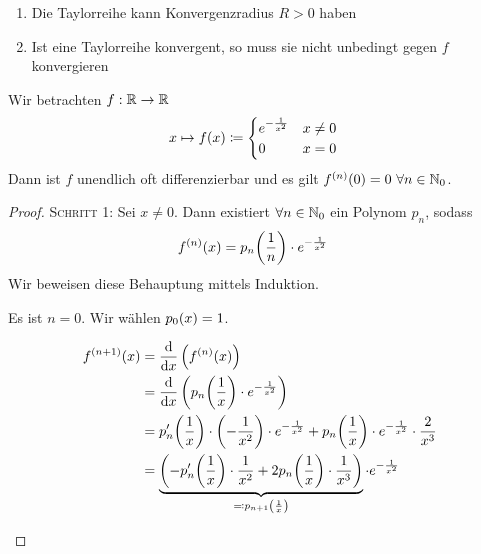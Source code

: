 \begin{bemerkung}
    \theoremescape
    \begin{enumerate}[label=(\roman*)]
        \item Die Taylorreihe kann Konvergenzradius $R > 0$ haben
        \item Ist eine Taylorreihe konvergent, so muss sie nicht unbedingt gegen $f$ konvergieren
    \end{enumerate}
\end{bemerkung}

\begin{beispiel}
    Wir betrachten $f: \mathbb{R}\rightarrow{}\mathbb{R}$
    \begin{align*}
        x\mapsto f\of{x}&\coloneqq \begin{cases}
                                       e^{-\frac{1}{x^2}} & x\neq 0\\
                                       0 &x=0
        \end{cases}
    \end{align*}
    Dann ist $f$ unendlich oft differenzierbar und es gilt $f^{(n)}\of{0} = 0~\forall n\in\N_0$.
    \begin{proof}
        \textsc{Schritt 1}: Sei $x\neq 0$. Dann existiert $\forall n\in\mathbb{N}_0$ ein Polynom $p_n$, sodass
        \begin{align*}
            f^{(n)}\of{x} &= p_n\of{\frac{1}{n}}\cdot e^{-\frac{1}{x^2}}
        \end{align*}
        Wir beweisen diese Behauptung mittels Induktion.~\\
        \begin{induktionsanfang}
            Es ist $n=0$. Wir wählen $p_0\of{x} = 1$.
        \end{induktionsanfang}
        \begin{induktionsschritt}
            \begin{align*}
                f^{(n+1)}\of{x} &= \frac{\dif}{\dif x}\pair{f^{(n)}\of{x}}\\
                &= \frac{\dif}{\dif x}\pair{p_n\of{\frac{1}{x}}\cdot e^{-\frac{1}{x^2}}}\\
                &= p_n'\of{\frac{1}{x}}\cdot\pair{-\frac{1}{x^2}}\cdot e^{-\frac{1}{x^2}} + p_n\of{\frac{1}{x}}\cdot e^{-\frac{1}{x^2}}\cdot\frac{2}{x^3}\\
                &= \underbrace{\pair{-p_n'\of{\frac{1}{x}}\cdot\frac{1}{x^2} + 2p_n\of{\frac{1}{x}}\cdot\frac{1}{x^3}}}_{\eqqcolon p_{n+1}\of{\frac{1}{x}}}\cdot e^{-\frac{1}{x^2}}\\

\end{align*}
\end{induktionsschritt}
\end{proof}
\end{beispiel}

